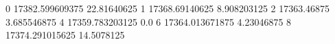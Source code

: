 0 17382.599609375 22.81640625
1 17368.69140625 8.908203125
2 17363.46875 3.685546875
4 17359.783203125 0.0
6 17364.013671875 4.23046875
8 17374.291015625 14.5078125
